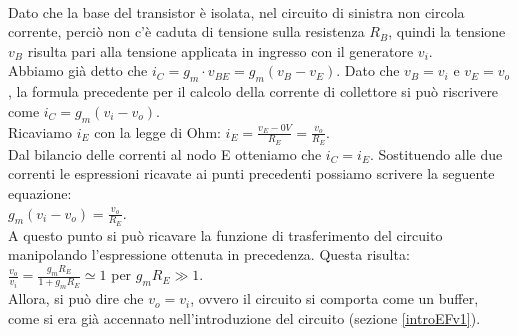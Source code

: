 \documentclass{report}
\begin{document}
\\Dato che la base del transistor è isolata, nel circuito di sinistra non circola corrente, perciò non c'è caduta di tensione sulla resistenza $R_B$, quindi la tensione $v_B$ risulta pari alla tensione applicata in ingresso con il generatore $v_i$.
\\Abbiamo già detto che $i_C=g_m\cdot v_{BE} = g_m(v_B-v_E) $. Dato che $v_B=v_i$ e $v_E=v_o$, la formula precedente per il calcolo della corrente di collettore si può riscrivere come $i_C=g_m(v_i-v_o)$.
\\[2pt]Ricaviamo $i_E$ con la legge di Ohm: 
$\displaystyle{i_E=\frac{v_E-0V}{R_E}=\frac{v_o}{R_E}}$.
\\[2 pt] Dal bilancio delle correnti al nodo E otteniamo che $i_C=i_E$. Sostituendo alle due correnti le espressioni ricavate ai punti precedenti possiamo scrivere la seguente equazione:
\\[2pt]\indent $\displaystyle{g_m(v_i-v_o)=\frac{v_o}{R_E}}$.
\\[2pt] A questo punto si può ricavare la funzione di trasferimento del circuito manipolando l'espressione ottenuta in precedenza. Questa risulta:
\\[2pt]\indent $\displaystyle{\frac{v_o}{v_i}=\frac{g_mR_E}{1+g_mR_E}\simeq1}$ per $g_mR_E\gg 1$. 
\\[2pt]Allora, si può dire che $v_o=v_i$, ovvero il circuito si comporta come un buffer, come si era già accennato nell'introduzione del circuito (sezione \ref{introEFv1}).
\end{document}
